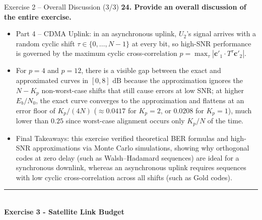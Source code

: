 \documentclass[10pt, aspectratio=169]{beamer}
\newcommand{\question}[1]{{\color{QuestionRed}\textbf{#1}}}
\begin{document}
	\begin{frame}{Exercise 2 -- Overall Discussion (3/3)}
		\question{24. Provide an overall discussion of the entire exercise.}
		
		\vspace{0.1cm}
		\begin{itemize}
			\item Part 4 -- CDMA Uplink: in an asynchronous uplink, $U_2$'s signal arrives with a random cyclic shift $\tau \in \{0, \dots, N-1\}$ at every bit, so high-SNR performance is governed by the maximum cyclic cross-correlation $p = \max_\tau |\mathbf{c}'_1 \cdot T^\tau\mathbf{c}'_2|$.
			\item For $p = 4$ and $p = 12$, there is a visible gap between the exact and approximated curves in $[0, 8]\text{ dB}$ because the approximation ignores the $N - K_p$ non-worst-case shifts that still cause errors at low SNR; at higher $E_b/N_0$, the exact curve converges to the approximation and flattens at an error floor of $K_p/(4N)$ ($\approx 0.0417$ for $K_p = 2$, or $0.0208$ for $K_p = 1$), much lower than $0.25$ since worst-case alignment occurs only $K_p/N$ of the time.
			\item Final Takeaways: this exercise verified theoretical BER formulas and high-SNR approximations via Monte Carlo simulations, showing why orthogonal codes at zero delay (such as Walsh--Hadamard sequences) are ideal for a synchronous downlink, whereas an asynchronous uplink requires sequences with low cyclic cross-correlation across all shifts (such as Gold codes).
		\end{itemize}
		
	\end{frame}
	
	\begin{frame}[plain]
		\vfill
		\centering
		{\color{TealAccent}\rule{2cm}{2pt}}\\[0.4cm]
		{\LARGE\bfseries\color{NavyPrimary} Exercise 3 - Satellite Link Budget}\\[0.2cm]
		\vfill
	\end{frame}
	
\end{document}
